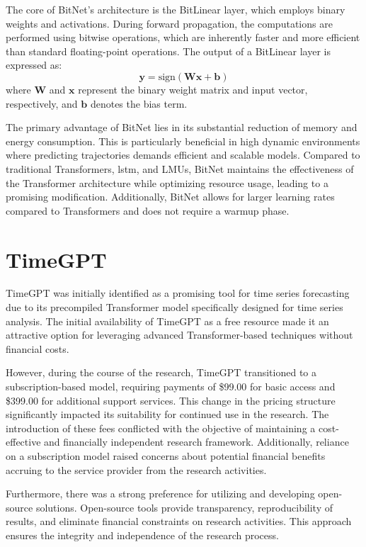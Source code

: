 The core of BitNet's architecture is the BitLinear layer, which employs binary weights and activations. During forward propagation, the computations are performed using bitwise operations, which are inherently faster and more efficient than standard floating-point operations. The output of a BitLinear layer is expressed as:
\[
\mathbf{y} = \text{sign}(\mathbf{W}\mathbf{x} + \mathbf{b})
\]
where \(\mathbf{W}\) and \(\mathbf{x}\) represent the binary weight matrix and input vector, respectively, and \(\mathbf{b}\) denotes the bias term.

The primary advantage of BitNet lies in its substantial reduction of memory and energy consumption. This is particularly beneficial in high dynamic environments where predicting trajectories demands efficient and scalable models. Compared to traditional Transformers, \gls{lstm}, and LMUs, BitNet maintains the effectiveness of the Transformer architecture while optimizing resource usage, leading to a promising modification. Additionally, BitNet allows for larger learning rates compared to Transformers and does not require a warmup phase.

\section{TimeGPT}
\label{sect:timegpt}

TimeGPT was initially identified as a promising tool for time series forecasting due to its precompiled Transformer model specifically designed for time series analysis. The initial availability of TimeGPT as a free resource made it an attractive option for leveraging advanced Transformer-based techniques without financial costs.

However, during the course of the research, TimeGPT transitioned to a subscription-based model, requiring payments of \$99.00 for basic access and \$399.00 for additional support services. This change in the pricing structure significantly impacted its suitability for continued use in the research. The introduction of these fees conflicted with the objective of maintaining a cost-effective and financially independent research framework. Additionally, reliance on a subscription model raised concerns about potential financial benefits accruing to the service provider from the research activities.

Furthermore, there was a strong preference for utilizing and developing open-source solutions. Open-source tools provide transparency, reproducibility of results, and eliminate financial constraints on research activities. This approach ensures the integrity and independence of the research process.

